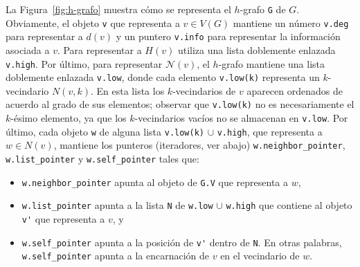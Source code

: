 \documentclass[%
    a4paper,%
    fontsize=12pt,%
    DIV=12,
    twoside,%
    openright,%
    titlepage=true,%
    headsepline,%
    toc=bibliography,%
    parskip=half,%
    cleardoublepage=empty,%
    headings=big,%
]{scrbook}
\makeatletter
\newcommand{\Code}[1]{\lstinline[basicstyle={\ttfamily}]@#1@}
\newcommand{\N}{\mathcal{N}}
\makeatother
\begin{document}
La Figura~\ref{fig:h-grafo} muestra cómo se representa el $h$-grafo \Code{G} de $G$.  Obviamente, el objeto \Code{v} que representa a $v \in V(G)$ mantiene un número \Code{v.deg} para representar a $d(v)$ y un puntero \Code{v.info} para representar la información asociada a $v$. Para representar a $H(v)$ utiliza una lista doblemente enlazada \Code{v.high}.  Por último, para representar $\N(v)$, el $h$-grafo mantiene una lista doblemente enlazada \Code{v.low}, donde cada elemento \Code{v.low(k)} representa un $k$-vecindario $N(v,k)$.  En esta lista los $k$-vecindarios de $v$ aparecen ordenados de acuerdo al grado de sus elementos; observar que \Code{v.low(k)} no es necesariamente el $k$-ésimo elemento, ya que los $k$-vecindarios vacíos no se almacenan en \Code{v.low}.  Por último, cada objeto \Code{w} de alguna lista \Code{v.low(k)} $\cup$ \Code{v.high}, que representa a $w \in N(v)$, mantiene los punteros (iteradores, ver abajo) \Code{w.neighbor_pointer}, \Code{w.list_pointer} y \Code{w.self_pointer} tales que:
\begin{itemize}
  \item \Code{w.neighbor_pointer} apunta al objeto de \Code{G.V} que representa a $w$,
  \item \Code{w.list_pointer} apunta a la lista \Code{N} de \Code{w.low} $\cup$ \Code{w.high} que contiene al objeto \Code{v'} que representa a $v$, y
  \item \Code{w.self_pointer} apunta a la posición de \Code{v'} dentro de \Code{N}.  En otras palabras, \Code{w.self_pointer} apunta a la encarnación de $v$ en el vecindario de $w$.
\end{itemize}

\newcommand{\caja}[1]{\fbox{\!\scriptsize#1\!}}
\newcommand{\VV}[3]{v_{#1}\caja{#2}=\left\{\parbox{13cm}{\ensuremath{#3}}\right.}
\newcommand{\NNN}[1]{\mathcal{N}=\left\{\parbox{11.5cm}{\ensuremath{#1}}\right.}
\newcommand{\NNNEmpty}{\mathcal{N}=\emptyset}
\newcommand{\neigh}[5]{#1\caja{#2}: \mathtt{s}=#3, \mathtt{l}=#4, \mathtt{n}=#5}
\newcommand{\NN}[3]{\mathtt{N}(#1)\caja{#2}=[#3]}
\newcommand{\NH}[2]{\mathtt{H}\caja{#1}=[#2]}
\end{document}
